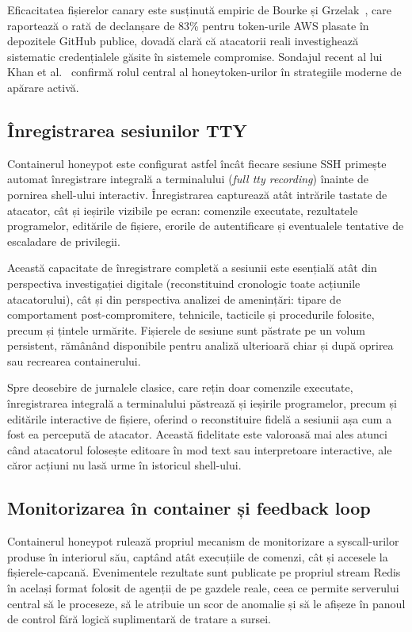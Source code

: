 Eficacitatea fișierelor canary este susținută empiric de Bourke și
Grzelak~\cite{bourke2018awstokens}, care raportează o rată de declanșare de 83\% pentru
token-urile AWS plasate în depozitele GitHub publice, dovadă clară că atacatorii reali
investighează sistematic credențialele găsite în sistemele compromise. Sondajul recent al lui
Khan et al.~\cite{honeytokenssurvey2024} confirmă rolul central al honeytoken-urilor în
strategiile moderne de apărare activă.

\subsection{Înregistrarea sesiunilor TTY}

Containerul honeypot este configurat astfel încât fiecare sesiune SSH primește automat
înregistrare integrală a terminalului (\textit{full tty recording}) înainte de pornirea
shell-ului interactiv. Înregistrarea capturează atât intrările tastate de atacator, cât și
ieșirile vizibile pe ecran: comenzile executate, rezultatele programelor, editările de
fișiere, erorile de autentificare și eventualele tentative de escaladare de privilegii.

Această capacitate de înregistrare completă a sesiunii este esențială atât din perspectiva
investigației digitale (reconstituind cronologic toate acțiunile atacatorului), cât și din
perspectiva analizei de amenințări: tipare de comportament post-compromitere, tehnicile,
tacticile și procedurile folosite, precum și țintele urmărite. Fișierele de sesiune sunt
păstrate pe un volum persistent, rămânând disponibile pentru analiză ulterioară chiar și
după oprirea sau recrearea containerului.

Spre deosebire de jurnalele clasice, care rețin doar comenzile executate,
înregistrarea integrală a terminalului păstrează și ieșirile programelor, precum
și editările interactive de fișiere, oferind o reconstituire fidelă a sesiunii
așa cum a fost ea percepută de atacator. Această fidelitate este valoroasă mai
ales atunci când atacatorul folosește editoare în mod text sau interpretoare
interactive, ale căror acțiuni nu lasă urme în istoricul shell-ului.

\subsection{Monitorizarea în container și feedback loop}

Containerul honeypot rulează propriul mecanism de monitorizare a syscall-urilor produse în
interiorul său, captând atât execuțiile de comenzi, cât și accesele la fișierele-capcană.
Evenimentele rezultate sunt publicate pe propriul stream Redis în același format folosit de
agenții de pe gazdele reale, ceea ce permite serverului central să le proceseze, să le
atribuie un scor de anomalie și să le afișeze în panoul de control fără logică
suplimentară de tratare a sursei.

